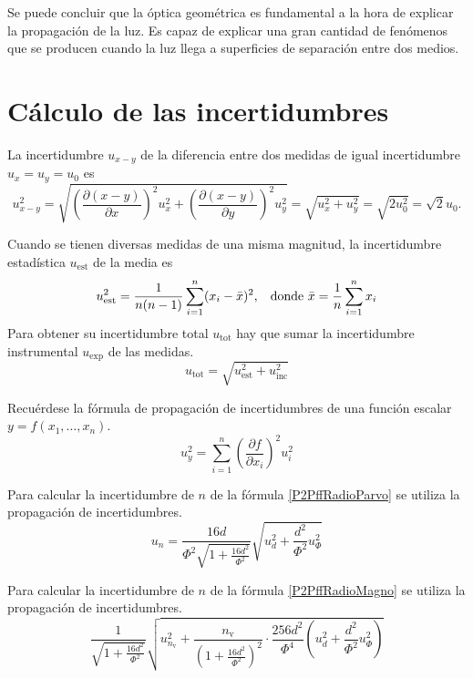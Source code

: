 \documentclass[12pt]{article}
\numberwithin{table}{section}
\numberwithin{figure}{section}
\numberwithin{equation}{section}
\begin{document}
Se puede concluir que la óptica geométrica es fundamental a la hora de explicar la propagación de la luz. Es capaz de explicar una gran cantidad de fenómenos que se producen cuando la luz llega a superficies de separación entre dos medios.

\appendix
\section{Cálculo de las incertidumbres}
La incertidumbre $u_{x-y}$ de la diferencia entre dos medidas de igual incertidumbre $u_x=u_y=u_0$ es
\begin{equation}\label{P2incdif}
u_{x-y}^2=\sqrt{\left(\frac{\partial(x-y)}{\partial x}\right)^2u_x^2+\left(\frac{\partial(x-y)}{\partial y}\right)^2u_y^2}=\sqrt{u_x^2+u_y^2}=\sqrt{2u_0^2}=\sqrt{2}u_0.
\end{equation}

Cuando se tienen diversas medidas de una misma magnitud, la incertidumbre estadística $u_{\text{est}}$ de la media es 
\begin{equation}\label{P2incest}
u_{\text{est}}^2=\frac{1}{n(n-1)}\sum_{i=1}^n(x_i-\bar{x})^2,\hspace{3mm}\text{donde }\bar{x}=\frac{1}{n}\sum_{i=1}^nx_i
\end{equation}
Para obtener su incertidumbre total $u_{\text{tot}}$ hay que sumar la incertidumbre instrumental $u_{\text{exp}}$ de las medidas.
\begin{equation}\label{P2incmedia}
u_{\text{tot}}=\sqrt{u_{\text{est}}^2+u_{\text{inc}}^2}
\end{equation}

Recuérdese la fórmula de propagación de incertidumbres de una función escalar $y=f(x_1,\ldots,x_n)$.
\begin{equation}\label{P2incprop}
u_y^2=\sum_{i=1}^n\left(\frac{\partial f}{\partial x_i}\right)^2u_i^2
\end{equation}

Para calcular la incertidumbre de $n$ de la fórmula \ref{P2PffRadioParvo} se utiliza la propagación de incertidumbres.
\begin{equation}\label{P2incradioparvo}
u_n=\frac{16d}{\Phi^2\sqrt{1+\frac{16d^2}{\Phi^2}}}\sqrt{u_d^2+\frac{d^2}{\Phi^2}u_\Phi^2}
\end{equation}

Para calcular la incertidumbre de $n$ de la fórmula \ref{P2PffRadioMagno} se utiliza la propagación de incertidumbres.
\begin{equation}\label{P2incradiomagno}
\frac{1}{\sqrt{1+\frac{16d^2}{\Phi^2}}}\sqrt{u_{n_\text{v}}^2+\frac{n_\text{v}}{\left(1+\frac{16d^2}{\Phi^2}\right)^2}\cdot\frac{256d^2}{\Phi^4}\left(u_d^2+\frac{d^2}{\Phi^2}u_\Phi^2\right)}
\end{equation}
\end{document}
